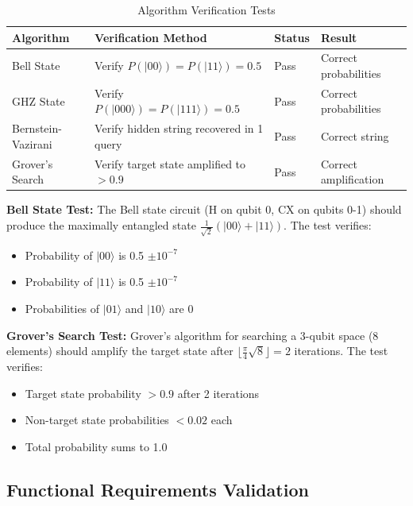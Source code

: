 \begin{table}[h]
\centering
\caption{Algorithm Verification Tests}
\begin{tabular}{|p{3cm}|p{5cm}|p{2cm}|p{2.5cm}|}
\hline
\textbf{Algorithm} & \textbf{Verification Method} & \textbf{Status} & \textbf{Result} \\
\hline
Bell State & Verify $P(|00\rangle) = P(|11\rangle) = 0.5$ & Pass & Correct probabilities \\
\hline
GHZ State & Verify $P(|000\rangle) = P(|111\rangle) = 0.5$ & Pass & Correct probabilities \\
\hline
Bernstein-Vazirani & Verify hidden string recovered in 1 query & Pass & Correct string \\
\hline
Grover's Search & Verify target state amplified to $>0.9$ & Pass & Correct amplification \\
\hline
\end{tabular}
\end{table}

\textbf{Bell State Test:}
The Bell state circuit (H on qubit 0, CX on qubits 0-1) should produce the maximally entangled state $\frac{1}{\sqrt{2}}(|00\rangle + |11\rangle)$. The test verifies:
\begin{itemize}
\item Probability of $|00\rangle$ is 0.5 $\pm 10^{-7}$
\item Probability of $|11\rangle$ is 0.5 $\pm 10^{-7}$
\item Probabilities of $|01\rangle$ and $|10\rangle$ are 0
\end{itemize}

\textbf{Grover's Search Test:}
Grover's algorithm for searching a 3-qubit space (8 elements) should amplify the target state after $\lfloor \frac{\pi}{4}\sqrt{8} \rfloor = 2$ iterations. The test verifies:
\begin{itemize}
\item Target state probability $> 0.9$ after 2 iterations
\item Non-target state probabilities $< 0.02$ each
\item Total probability sums to 1.0
\end{itemize}

\subsection{Functional Requirements Validation}

